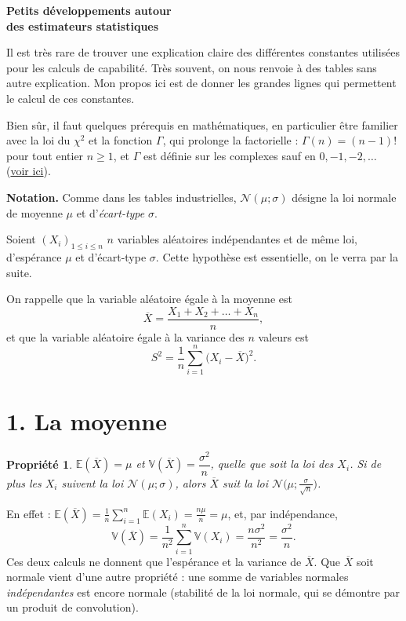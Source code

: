 \documentclass[11pt,a4paper]{article}
\theoremstyle{sj}
\newtheorem*{prop}{Propriété}
\theoremstyle{remark}
\newcommand{\E}{\mathbb{E}}
\newcommand{\V}{\mathbb{V}}
\newcommand{\N}{\mathcal{N}}
\newcommand{\Xb}{\overline{X}}
\begin{document}
{\raggedright\Huge\bfseries Petits développements autour\\[4pt] des estimateurs statistiques\par}

\bigskip
Il est très rare de trouver une explication claire des différentes constantes utilisées pour les calculs de capabilité. Très souvent, on nous renvoie à des tables sans autre explication. Mon propos ici est de donner les grandes lignes qui permettent le calcul de ces constantes.

Bien sûr, il faut quelques prérequis en mathématiques, en particulier être familier avec la loi du $\chi^2$ et la fonction $\Gamma$, qui prolonge la factorielle : $\Gamma(n)=(n-1)!$ pour tout entier $n\ge1$, et $\Gamma$ est définie sur les complexes sauf en $0,-1,-2,\dots$ (\href{https://fr.wikipedia.org/wiki/Fonction_gamma}{voir ici}).

\textbf{Notation.} Comme dans les tables industrielles, $\N(\mu;\sigma)$ désigne la loi normale de moyenne $\mu$ et d'\emph{écart-type} $\sigma$.

Soient $(X_i)_{1\le i\le n}$ $n$ variables aléatoires indépendantes et de même loi, d'espérance $\mu$ et d'écart-type $\sigma$. Cette hypothèse est essentielle, on le verra par la suite.

On rappelle que la variable aléatoire égale à la moyenne est
\[
\Xb=\frac{X_1+X_2+\dots+X_n}{n},
\]
et que la variable aléatoire égale à la variance des $n$ valeurs est
\[
S^2=\frac1n\sum_{i=1}^n\big(X_i-\Xb\big)^2 .
\]

\section*{1. La moyenne}

\begin{prop}
$\E(\Xb)=\mu$ et $\V(\Xb)=\dfrac{\sigma^2}{n}$, quelle que soit la loi des $X_i$.
Si de plus les $X_i$ suivent la loi $\N(\mu;\sigma)$, alors $\Xb$ suit la loi $\N\big(\mu;\frac{\sigma}{\sqrt n}\big)$.
\end{prop}

En effet : $\E(\Xb)=\frac1n\sum_{i=1}^n\E(X_i)=\frac{n\mu}{n}=\mu$, et, par indépendance,
\[
\V(\Xb)=\frac{1}{n^2}\sum_{i=1}^n\V(X_i)=\frac{n\sigma^2}{n^2}=\frac{\sigma^2}{n}.
\]
Ces deux calculs ne donnent que l'espérance et la variance de $\Xb$. Que $\Xb$ soit normale vient d'une autre propriété : une somme de variables normales \emph{indépendantes} est encore normale (stabilité de la loi normale, qui se démontre par un produit de convolution).
\end{document}
